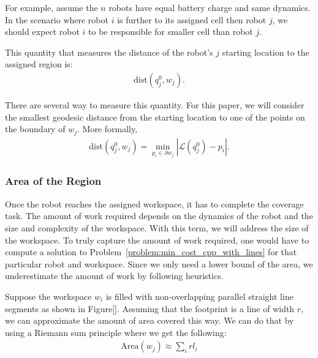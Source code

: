 \documentclass[../main.tex]{subfiles}
\begin{document}
For example, assume the $n$ robots have equal battery charge and same dynamics. In the scenario where robot $i$ is further to its assigned cell then robot $j$, we should expect robot $i$ to be responsible for smaller cell than robot $j$.

This quantity that measures the distance of the robot's $j$ starting location to the assigned region is:
\begin{equation}
\begin{aligned}
	\text{dist}(q^0_j,w_j).
\end{aligned}
\end{equation}

There are several way to measure this quantity. For this paper, we will consider the smallest geodesic distance from the starting location to one of the points on the boundary of $w_j$. More formally,
\begin{equation}
\begin{aligned}
	\text{dist}(q^0_j,w_j)=\min_{p_i\in\partial w_j}|\mathcal{L}(q^0_j)-p_i|.
\end{aligned}
\end{equation}


\subsubsection{Area of the Region}

Once the robot reaches the assigned workspace, it has to complete the coverage task. The amount of work required depends on the dynamics of the robot and the size and complexity of the workspace. With this term, we will address the size of the workspace. To truly capture the amount of work required, one would have to compute a solution to Problem~\ref{problem:min_cost_cpp_with_lines} for that particular robot and workspace. Since we only need a lower bound of the area, we underestimate the amount of work by following heuristics. 

Suppose the workspace $w_i$ is filled with non-overlapping parallel straight line segments as shown in Figure[]. Assuming that the footprint is a line of width $r$, we can approximate the amount of area covered this way. We can do that by using a Riemann sum principle where we get the following:
\begin{equation}
\begin{aligned}
		\text{Area}(w_j)\approx\sum_{i}rl_i
\end{aligned}
\end{equation}
\end{document}
